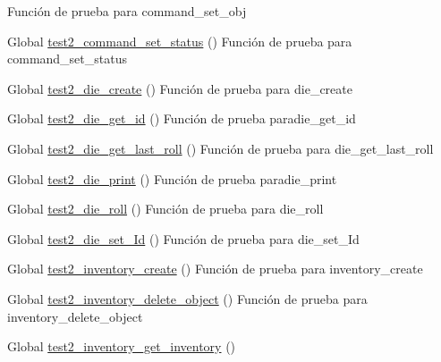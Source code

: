 \begin{DoxyRefList}
%
Función de prueba para command\+\_\+set\+\_\+obj  
\item[Global \mbox{\hyperlink{command__test_8c_a67ea36686a450269ef95eace71e78867}{test2\+\_\+command\+\_\+set\+\_\+status}} ()]\label{test__test000007}%
%
Función de prueba para command\+\_\+set\+\_\+status  
\item[Global \mbox{\hyperlink{die__test_8c_a2508c1329b5002e3830945dd9ad7f726}{test2\+\_\+die\+\_\+create}} ()]\label{test__test000028}%
%
Función de prueba para die\+\_\+create  
\item[Global \mbox{\hyperlink{die__test_8c_a9c76572bbb86ca9138b99a010e6a184a}{test2\+\_\+die\+\_\+get\+\_\+id}} ()]\label{test__test000037}%
%
Función de prueba paradie\+\_\+get\+\_\+id  
\item[Global \mbox{\hyperlink{die__test_8c_a0832aa306964705770b2f1240763d962}{test2\+\_\+die\+\_\+get\+\_\+last\+\_\+roll}} ()]\label{test__test000035}%
%
Función de prueba para die\+\_\+get\+\_\+last\+\_\+roll  
\item[Global \mbox{\hyperlink{die__test_8c_a5bf5f30b38f256efc0c6e91ef538f5f1}{test2\+\_\+die\+\_\+print}} ()]\label{test__test000039}%
%
Función de prueba paradie\+\_\+print  
\item[Global \mbox{\hyperlink{die__test_8c_af7df60d905acf9505f1e434c6f75d027}{test2\+\_\+die\+\_\+roll}} ()]\label{test__test000030}%
%
Función de prueba para die\+\_\+roll  
\item[Global \mbox{\hyperlink{die__test_8c_aba25cb59703baaefe0072882b847925d}{test2\+\_\+die\+\_\+set\+\_\+\+Id}} ()]\label{test__test000032}%
%
Función de prueba para die\+\_\+set\+\_\+\+Id  
\item[Global \mbox{\hyperlink{inventory__test_8c_a73a6080c360a8870c4ffc734e989c8b3}{test2\+\_\+inventory\+\_\+create}} ()]\label{test__test000042}%
%
Función de prueba para inventory\+\_\+create  
\item[Global \mbox{\hyperlink{inventory__test_8c_a7df95a4c69353ae9bf0766e3d13672f8}{test2\+\_\+inventory\+\_\+delete\+\_\+object}} ()]\label{test__test000057}%
%
Función de prueba para inventory\+\_\+delete\+\_\+object  
\item[Global \mbox{\hyperlink{inventory__test_8c_a800414ee6d964ee2424534f14a4dbda9}{test2\+\_\+inventory\+\_\+get\+\_\+inventory}} ()]\label{test__test000052}%

\end{DoxyRefList}
